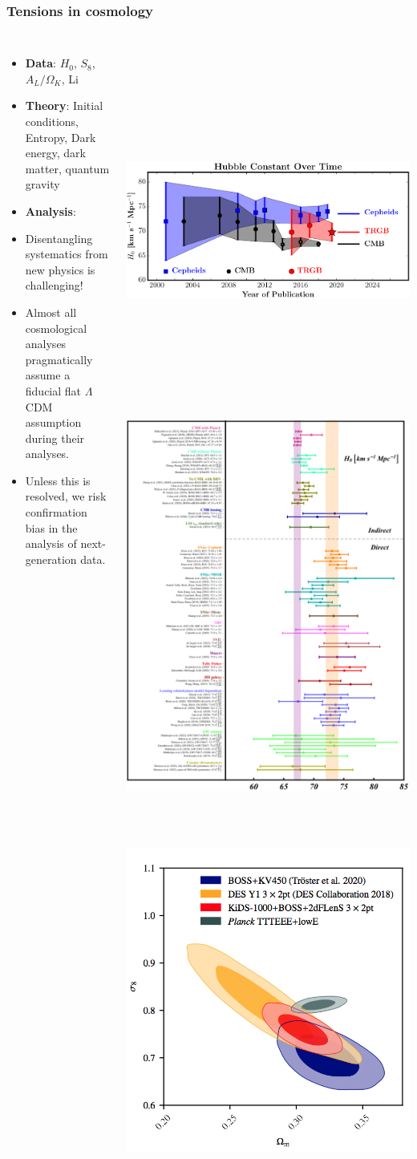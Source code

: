\documentclass[aspectratio=169]{beamer}
\begin{document}
\begin{frame}
    \frametitle{Tensions in cosmology}
    \begin{columns}
        \begin{itemize}
            \item \textbf{Data}:
                $H_0$, $S_8$, $A_L/\Omega_K$, Li
            \item \textbf{Theory}:
                Initial conditions, Entropy, Dark energy, dark matter, quantum gravity
            \item \textbf{Analysis}:
            \item Disentangling systematics from new physics is challenging!
            \item Almost all cosmological analyses pragmatically assume a fiducial flat $\Lambda$CDM assumption during their analyses.
            \item Unless this is resolved, we risk confirmation bias in the analysis of next-generation data.
        \end{itemize}
        \includegraphics[height=0.45\textwidth]{figures/hubble_tension}%
        \includegraphics[height=0.45\textwidth]{figures/hubble_survey}
        \includegraphics[height=0.5\textwidth]{figures/S8}%

\end{columns}
\end{frame}
\end{document}
